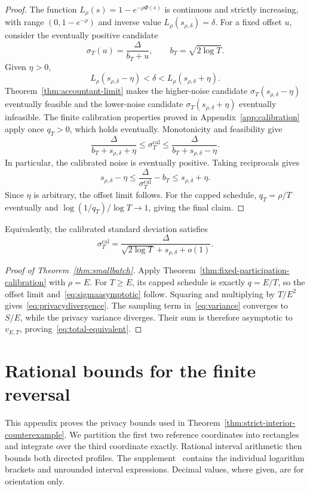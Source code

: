 \documentclass[11pt]{article}
\theoremstyle{remark}
\begin{document}
\begin{proof}
The function $L_\rho(s)=1-e^{-\rho\Phi(s)}$ is continuous and strictly
increasing, with range $(0,1-e^{-\rho})$ and inverse value
$L_\rho(s_{\rho,\delta})=\delta$. For a fixed offset $u$, consider the
eventually positive candidate
\[
 \sigma_T(u)=\frac\Delta{b_T+u},\qquad b_T=\sqrt{2\log T}.
\]
Given $\eta>0$,
\[
 L_\rho(s_{\rho,\delta}-\eta)<\delta
 <L_\rho(s_{\rho,\delta}+\eta).
\]
Theorem~\ref{thm:accountant-limit} makes the higher-noise candidate
$\sigma_T(s_{\rho,\delta}-\eta)$ eventually feasible and the lower-noise
candidate $\sigma_T(s_{\rho,\delta}+\eta)$ eventually infeasible.
The finite calibration properties proved in Appendix~\ref{app:calibration}
apply once $q_T>0$, which holds eventually. Monotonicity and feasibility give
\[
 \frac\Delta{b_T+s_{\rho,\delta}+\eta}
 \leq\sigma_T^{\mathrm{cal}}
 \leq\frac\Delta{b_T+s_{\rho,\delta}-\eta}.
\]
In particular, the calibrated noise is eventually positive. Taking
reciprocals gives
\[
 s_{\rho,\delta}-\eta
 \leq\frac\Delta{\sigma_T^{\mathrm{cal}}}-b_T
 \leq s_{\rho,\delta}+\eta.
\]
Since $\eta$ is arbitrary, the offset limit follows. For the capped schedule,
$q_T=\rho/T$ eventually and $\log(1/q_T)/\log T\to1$, giving the final claim.
\end{proof}

Equivalently, the calibrated standard deviation satisfies
\begin{equation}\label{eq:offset-approximation}
 \sigma_T^{\mathrm{cal}}
 =\frac\Delta{\sqrt{2\log T}+s_{\rho,\delta}+o(1)}.
\end{equation}

\begin{proof}[Proof of Theorem~\ref{thm:smallbatch}]
Apply Theorem~\ref{thm:fixed-participation-calibration} with $\rho=E$.
For $T\geq E$, its capped schedule is exactly $q=E/T$, so the offset limit
and~\eqref{eq:sigmaasymptotic} follow. Squaring and multiplying by $T/E^2$
gives~\eqref{eq:privacydivergence}. The sampling term in~\eqref{eq:variance}
converges to $S/E$, while the privacy variance diverges. Their sum is
therefore asymptotic to $v_{E,T}$, proving~\eqref{eq:total-equivalent}.
\end{proof}

\section{Rational bounds for the finite reversal}\label{app:rational-calculation}
This appendix proves the privacy bounds used in
Theorem~\ref{thm:strict-interior-counterexample}. We partition the first two
reference coordinates into rectangles and integrate over the third
coordinate exactly. Rational interval arithmetic then bounds both directed
profiles. The supplement~\cite{rational-supplement} contains the individual
logarithm brackets and unrounded interval expressions. Decimal values, where
given, are for orientation only.
\end{document}
